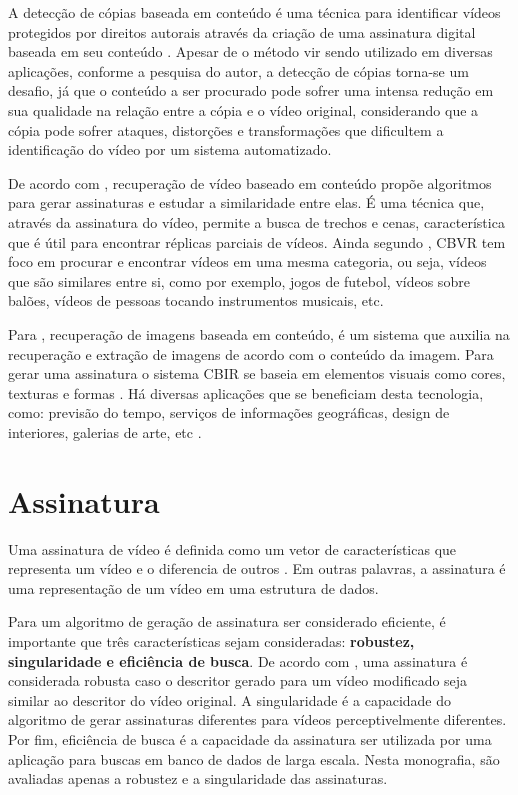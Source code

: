     A detecção de cópias baseada em conteúdo é uma técnica para identificar vídeos protegidos por direitos autorais através da criação de uma assinatura digital baseada em seu conteúdo \citeauthor{jiang2011pku}. Apesar de o método vir sendo utilizado em diversas aplicações, conforme a pesquisa do autor, a detecção de cópias torna-se um desafio, já que o conteúdo a ser procurado pode sofrer uma intensa redução em sua qualidade na relação entre a cópia e o vídeo original, considerando que a cópia pode sofrer ataques, distorções e transformações que dificultem a identificação do vídeo por um sistema automatizado. 

De acordo com \citeauthor{law2007video}, recuperação de vídeo baseado em conteúdo propõe algoritmos para gerar assinaturas e estudar a similaridade entre elas. É uma técnica que, através da assinatura do vídeo, permite a busca de trechos e cenas, característica que é útil para encontrar réplicas parciais de vídeos. Ainda segundo \citeauthor{law2007video}, CBVR tem foco em procurar e encontrar vídeos em uma mesma categoria, ou seja, vídeos que são similares entre si, como por exemplo, jogos de futebol, vídeos sobre balões, vídeos de pessoas tocando instrumentos musicais, etc.

Para \citeauthor{gudivada1995content}, recuperação de imagens baseada em conteúdo, é um sistema que auxilia na recuperação e extração de imagens de acordo com o conteúdo da imagem. Para gerar uma assinatura o sistema CBIR se baseia em elementos visuais como cores, texturas e formas \citeauthor{vikhar2016improved}. Há diversas aplicações que se beneficiam desta tecnologia, como: previsão do tempo, serviços de informações geográficas, design de interiores, galerias de arte, etc \citeauthor{gudivada1995content}.
         
         
         
\section{Assinatura}
\label{sec:assinatura} 
    
	Uma assinatura de vídeo é definida como um vetor de características que representa um vídeo e o diferencia de outros \citeauthor{lee2008robust}. Em outras palavras, a assinatura é uma representação de um vídeo em uma estrutura de dados. 
        
	Para um algoritmo de geração de assinatura ser considerado eficiente, é importante que três características sejam consideradas: \textbf{robustez, singularidade e eficiência de busca}. De acordo com \citeauthor{lee2008robust}, uma assinatura é considerada robusta caso o descritor gerado para um vídeo modificado seja similar ao descritor do vídeo original. A singularidade é a capacidade do algoritmo de gerar assinaturas diferentes para vídeos perceptivelmente diferentes. Por fim, eficiência de busca é a capacidade da assinatura  ser utilizada por uma aplicação para buscas em banco de dados de larga escala. Nesta monografia, são avaliadas apenas a robustez e a singularidade das assinaturas.   
    
